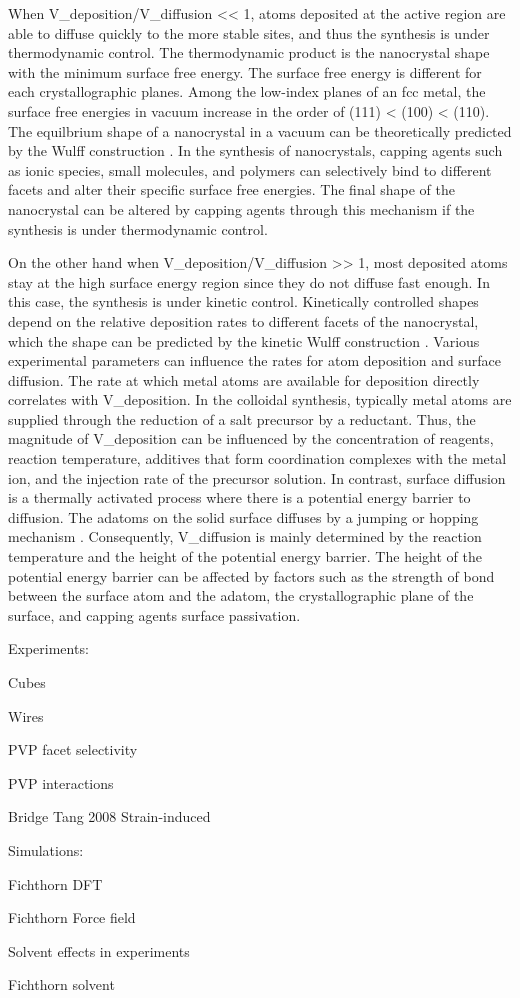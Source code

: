 When V_{deposition}/V_{diffusion} << 1, atoms deposited at the active region are able to diffuse quickly to the more stable sites, and thus the synthesis is under thermodynamic control.
The thermodynamic product is the nanocrystal shape with the minimum surface free energy.
The surface free energy is different for each crystallographic planes.
Among the low-index planes of an fcc metal, the surface free energies in vacuum increase in the order of (111) < (100) < (110).
The equilbrium shape of a nanocrystal in a vacuum can be theoretically predicted by the Wulff construction \cite{Bodineau_1999}.
In the synthesis of nanocrystals, capping agents such as ionic species, small molecules, and polymers can selectively bind to different facets and alter their specific surface free energies.
The final shape of the nanocrystal can be altered by capping agents through this mechanism if the synthesis is under thermodynamic control.

On the other hand when V_{deposition}/V_{diffusion} >> 1, most deposited atoms stay at the high surface energy region since they do not diffuse fast enough.
In this case, the synthesis is under kinetic control.
Kinetically controlled shapes depend on the relative deposition rates to different facets of the nanocrystal, which the shape can be predicted by the kinetic Wulff construction \cite{Zhang_2006}.
Various experimental parameters can influence the rates for atom deposition and surface diffusion.
The rate at which metal atoms are available for deposition directly correlates with V_{deposition}.
In the colloidal synthesis, typically metal atoms are supplied through the reduction of a salt precursor by a reductant.
Thus, the magnitude of V_{deposition} can be influenced by the concentration of reagents, reaction temperature, additives that form coordination complexes with the metal ion, and the injection rate of the precursor solution.
In contrast, surface diffusion is a thermally activated process where there is a potential energy barrier to diffusion.
The adatoms on the solid surface diffuses by a jumping or hopping mechanism \cite{1997}.
Consequently, V_{diffusion} is mainly determined by the reaction temperature and the height of the potential energy barrier.
The height of the potential energy barrier can be affected by factors such as the strength of bond between the surface atom and the adatom, the crystallographic plane of the surface, and capping agents surface passivation.

Experiments:

Cubes

Wires

PVP facet selectivity

PVP interactions

Bridge Tang 2008 Strain-induced

Simulations:

Fichthorn DFT

Fichthorn Force field

Solvent effects in experiments

Fichthorn solvent
  
  
  
  
  
  